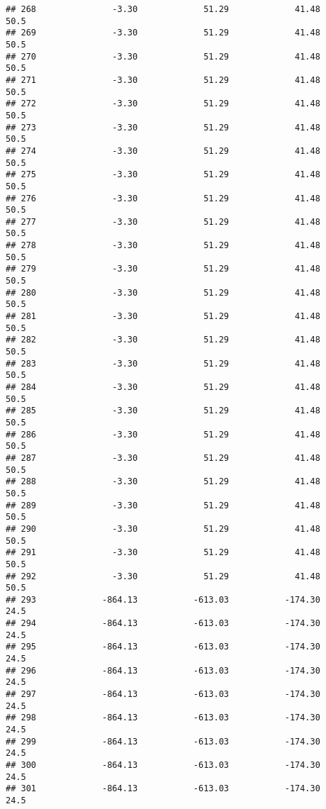\documentclass[]{article}
\begin{document}
\begin{verbatim}
## 268               -3.30             51.29             41.48           50.5
## 269               -3.30             51.29             41.48           50.5
## 270               -3.30             51.29             41.48           50.5
## 271               -3.30             51.29             41.48           50.5
## 272               -3.30             51.29             41.48           50.5
## 273               -3.30             51.29             41.48           50.5
## 274               -3.30             51.29             41.48           50.5
## 275               -3.30             51.29             41.48           50.5
## 276               -3.30             51.29             41.48           50.5
## 277               -3.30             51.29             41.48           50.5
## 278               -3.30             51.29             41.48           50.5
## 279               -3.30             51.29             41.48           50.5
## 280               -3.30             51.29             41.48           50.5
## 281               -3.30             51.29             41.48           50.5
## 282               -3.30             51.29             41.48           50.5
## 283               -3.30             51.29             41.48           50.5
## 284               -3.30             51.29             41.48           50.5
## 285               -3.30             51.29             41.48           50.5
## 286               -3.30             51.29             41.48           50.5
## 287               -3.30             51.29             41.48           50.5
## 288               -3.30             51.29             41.48           50.5
## 289               -3.30             51.29             41.48           50.5
## 290               -3.30             51.29             41.48           50.5
## 291               -3.30             51.29             41.48           50.5
## 292               -3.30             51.29             41.48           50.5
## 293             -864.13           -613.03           -174.30           24.5
## 294             -864.13           -613.03           -174.30           24.5
## 295             -864.13           -613.03           -174.30           24.5
## 296             -864.13           -613.03           -174.30           24.5
## 297             -864.13           -613.03           -174.30           24.5
## 298             -864.13           -613.03           -174.30           24.5
## 299             -864.13           -613.03           -174.30           24.5
## 300             -864.13           -613.03           -174.30           24.5
## 301             -864.13           -613.03           -174.30           24.5

\end{verbatim}
\end{document}

